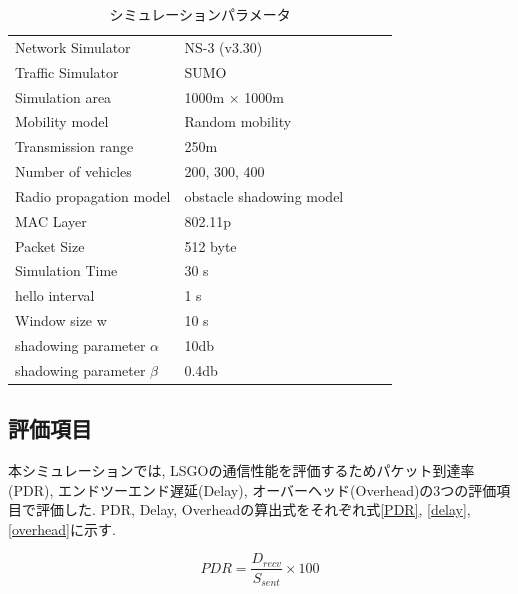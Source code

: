 \documentclass[10pt]{jreport}
\begin{document}
\begin{table}[!ht]
	\begin{center}
		\caption{シミュレーションパラメータ}
		\label{tab:parameter}
		\begin{tabular}{|l|l|lll}
			\cline{1-2}
			Network Simulator    & NS-3 (v3.30) &  &  &  \\ \cline{1-2}
			Traffic Simulator    & SUMO &  &  &  \\ \cline{1-2}
			Simulation area    & 1000m × 1000m   &  &  &  \\ \cline{1-2}
			Mobility model     & Random mobility &  &  &  \\ \cline{1-2}
			Transmission range & 250m            &  &  &  \\ \cline{1-2}
			Number of vehicles & 200, 300, 400      &  &  &  \\ \cline{1-2}
			Radio propagation model    & obstacle shadowing model\cite{20}&  &  &  \\ \cline{1-2}
			MAC Layer     & 802.11p &  &  &  \\ \cline{1-2}
			Packet Size & 512 byte       &  &  &  \\ \cline{1-2}
			Simulation Time & 30 s      &  &  &  \\ \cline{1-2}
			hello interval & 1 s      &  &  &  \\ \cline{1-2}
			Window size w  & 10 s      &  &  &  \\ \cline{1-2}
			shadowing parameter $\alpha$  & 10db      &  &  &  \\ \cline{1-2}
			shadowing parameter $\beta$    & 0.4db &  &  \\ \cline{1-2}
		\end{tabular}
	\end{center}
\end{table}

\subsection{評価項目}
\label{evaluation_item}
本シミュレーションでは, LSGOの通信性能を評価するためパケット到達率(PDR), エンドツーエンド遅延(Delay), オーバーヘッド(Overhead)の3つの評価項目で評価した. PDR, Delay, Overheadの算出式をそれぞれ式\ref{PDR}, \ref{delay}, \ref{overhead}に示す.

\begin{equation}
	\label{PDR}
	PDR = \frac{D_{recv}}{  S_{sent}  } \times 100
\end{equation}
\end{document}
